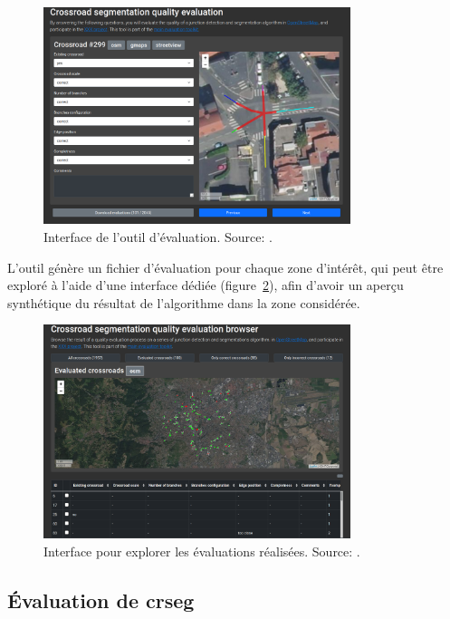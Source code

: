 \begin{figure}[ht]
    \centering
    \includegraphics[width=0.8\textwidth]{images/evaluation/evaluation-xxx.png}
    \caption{Interface de l'outil d'évaluation. Source: \cite{Favreau2022}.}
    \label{fig:evaluationTool}
\end{figure}

\newpar{}

L'outil génère un fichier d'évaluation pour chaque zone d'intérêt, qui peut être exploré à l'aide d'une interface dédiée (figure~\ref{fig:explorer}), afin d'avoir un aperçu synthétique du résultat de l'algorithme dans la zone considérée.

\begin{figure}[ht]
    \centering
    \includegraphics[width=0.8\textwidth]{images/evaluation/eval-browser-xxx.png}
    \caption{Interface pour explorer les évaluations réalisées. Source: \cite{Favreau2022}.}
    \label{fig:explorer}
\end{figure}

\subsection{Évaluation de crseg}

